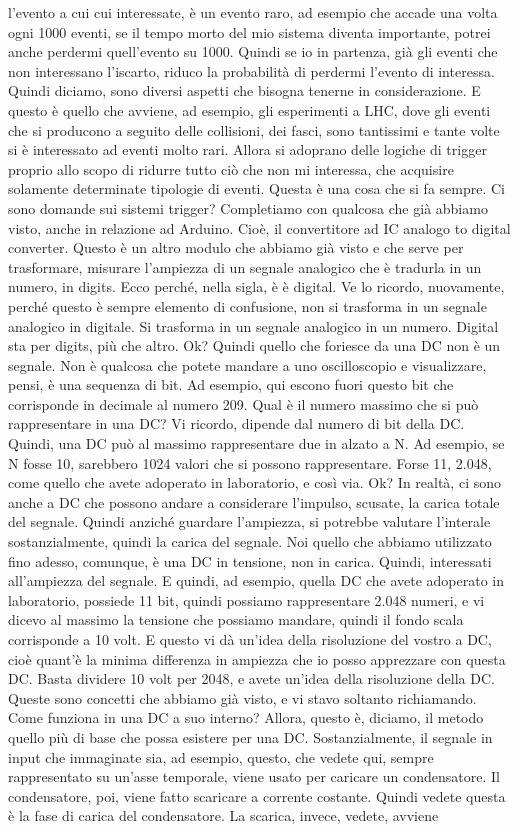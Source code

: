 {l'evento a cui cui interessate, è un evento raro, ad esempio che accade una volta ogni 1000 eventi, se il tempo morto del mio sistema diventa importante, potrei anche perdermi quell'evento su 1000. Quindi se io in partenza, già gli eventi che non interessano l'iscarto, riduco la probabilità di perdermi l'evento di interessa. Quindi diciamo, sono diversi aspetti che bisogna tenerne in considerazione. E questo è quello che avviene, ad esempio, gli esperimenti a LHC, dove gli eventi che si producono a seguito delle collisioni, dei fasci, sono tantissimi e tante volte si è interessato ad eventi molto rari. Allora si adoprano delle logiche di trigger proprio allo scopo di ridurre tutto ciò che non mi interessa, che acquisire solamente determinate tipologie di eventi. Questa è una cosa che si fa sempre. Ci sono domande sui sistemi trigger? Completiamo con qualcosa che già abbiamo visto, anche in relazione ad Arduino. Cioè, il convertitore ad IC analogo to digital converter. Questo è un altro modulo che abbiamo già visto e che serve per trasformare, misurare l'ampiezza di un segnale analogico che è tradurla in un numero, in digits. Ecco perché, nella sigla, è è digital. Ve lo ricordo, nuovamente, perché questo è sempre elemento di confusione, non si trasforma in un segnale analogico in digitale. Si trasforma in un segnale analogico in un numero. Digital sta per digits, più che altro. Ok? Quindi quello che foriesce da una DC non è un segnale. Non è qualcosa che potete mandare a uno oscilloscopio e visualizzare, pensi, è una sequenza di bit. Ad esempio, qui escono fuori questo bit che corrisponde in decimale al numero 209. Qual è il numero massimo che si può rappresentare in una DC? Vi ricordo, dipende dal numero di bit della DC. Quindi, una DC può al massimo rappresentare due in alzato a N. Ad esempio, se N fosse 10, sarebbero 1024 valori che si possono rappresentare. Forse 11, 2.048, come quello che avete adoperato in laboratorio, e così via. Ok? In realtà, ci sono anche a DC che possono andare a considerare l'impulso, scusate, la carica totale del segnale. Quindi anziché guardare l'ampiezza, si potrebbe valutare l'interale sostanzialmente, quindi la carica del segnale. Noi quello che abbiamo utilizzato fino adesso, comunque, è una DC in tensione, non in carica. Quindi, interessati all'ampiezza del segnale. E quindi, ad esempio, quella DC che avete adoperato in laboratorio, possiede 11 bit, quindi possiamo rappresentare 2.048 numeri, e vi dicevo al massimo la tensione che possiamo mandare, quindi il fondo scala corrisponde a 10 volt. E questo vi dà un'idea della risoluzione del vostro a DC, cioè quant'è la minima differenza in ampiezza che io posso apprezzare con questa DC. Basta dividere 10 volt per 2048, e avete un'idea della risoluzione della DC. Queste sono concetti che abbiamo già visto, e vi stavo soltanto richiamando. Come funziona in una DC a suo interno? Allora, questo è, diciamo, il metodo quello più di base che possa esistere per una DC. Sostanzialmente, il segnale in input che immaginate sia, ad esempio, questo, che vedete qui, sempre rappresentato su un'asse temporale, viene usato per caricare un condensatore. Il condensatore, poi, viene fatto scaricare a corrente costante. Quindi vedete questa è la fase di carica del condensatore. La scarica, invece, vedete, avviene }
